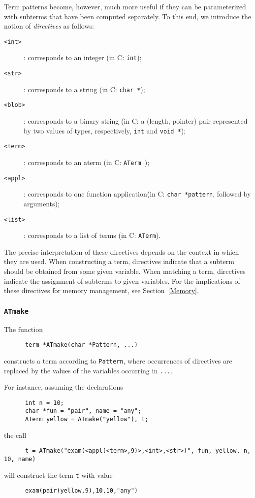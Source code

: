 \documentclass[a4,twoside,noweb]{article} %
\begin{document}
Term patterns become, however, much more useful if they can be parameterized
with subterms that have been computed separately.
To this end, we introduce the notion of {\em directives} as follows:

\begin{description}
\item[{\tt <int>}]: corresponds to an integer (in C: {\tt int});
\item[{\tt <str>}]: corresponds to a string (in C: {\tt char *});
\item[{\tt <blob>}]: corresponds to a binary string (in C: a (length, pointer) pair 
represented by two values of types, respectively, {\tt int} and {\tt void *});
\item[{\tt <term>}]: corresponds to an aterm (in C: {\tt ATerm });
\item[{\tt <appl>}]: corresponds to one function application(in C: {\tt char *pattern}, followed by arguments);
\item[{\tt <list>}]: corresponds to a list of terms (in C: {\tt ATerm}).
\end{description}

The precise interpretation of these directives depends on the context
in which they are used.  When constructing a term, directives indicate
that a subterm should be obtained from some given variable.  When
matching a term, directives indicate the assignment of subterms to
given variables.
For the implications of these directives for memory management,
see Section~\ref{Memory}.

\subsubsection{\label{ATmake}{\tt ATmake}}
The function
\begin{verbatim}
      term *ATmake(char *Pattern, ...)
\end{verbatim}
constructs a term according to {\tt Pattern}, where occurrences of
directives are replaced by the values of the variables
occurring in {\tt ...}.

For instance, assuming the declarations
\begin{verbatim}
      int n = 10;
      char *fun = "pair", name = "any";
      ATerm yellow = ATmake("yellow"), t;
\end{verbatim}
the call
\begin{verbatim}
      t = ATmake("exam(<appl(<term>,9)>,<int>,<str>)", fun, yellow, n, 10, name)
\end{verbatim}
will construct the term {\tt t} with value
\begin{verbatim}
      exam(pair(yellow,9),10,10,"any")
\end{verbatim}
\end{document}
